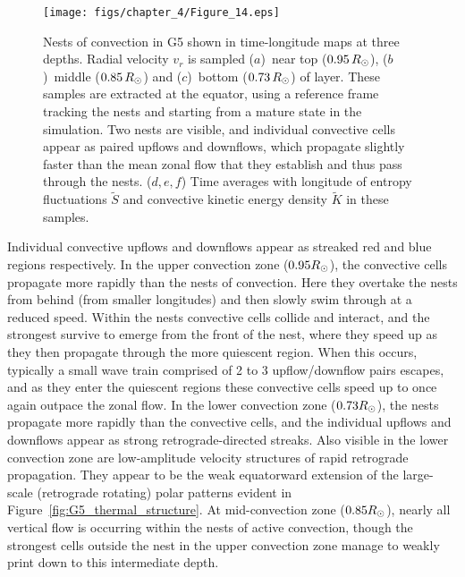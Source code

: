\begin{figure}
  \texttt{[image: figs/chapter\_4/Figure\_14.eps]}
  \caption[Nests of convection in G5 shown in time-longitude maps at three depths]
  {Nests of convection in G5 shown in time-longitude maps at three
  depths. Radial velocity $v_r$ is sampled ($a$)~near top
  ($0.95\thinspace R_\odot$), ($b$)~middle ($0.85\thinspace R_\odot$)
  and ($c$)~bottom ($0.73\thinspace R_\odot$) of layer.
  These samples are extracted at the equator, using a reference frame
  tracking the nests and starting from a mature state in the simulation.
  Two nests are visible, and individual convective cells appear
  as paired upflows and downflows, which propagate slightly faster than the mean zonal flow that they
  establish and thus pass through the nests.
  ($d,e,f$) Time averages with longitude of entropy fluctuations
  $\widetilde{S}$ and convective kinetic energy density $\widetilde{K}$ in these samples.
  \label{fig:time_longitude_map_turf5_all_3_depths}}
\end{figure}

Individual convective upflows and downflows appear as streaked red and blue regions
respectively.  In the upper convection zone ($0.95 R_\odot$), the
convective cells propagate more rapidly than the nests of convection.
Here they overtake the nests from behind (from smaller longitudes) and
then slowly swim through at a reduced speed.  Within the nests
convective cells collide and interact, and the strongest survive to
emerge from the front of the nest, where they speed up as they then
propagate through the more quiescent region.  
When this occurs, typically a small wave train comprised of 2 to 3
upflow/downflow pairs escapes, and as they enter the quiescent regions
these convective cells speed up to once again outpace the zonal flow.
In the lower convection
zone ($0.73 R_\odot$), the nests propagate more rapidly than the
convective cells, and the individual upflows and downflows appear as
strong retrograde-directed streaks.  Also visible in the lower
convection zone are low-amplitude velocity structures of rapid retrograde
propagation.  They appear to be the weak
equatorward extension of the large-scale (retrograde rotating) polar
patterns evident in Figure~\ref{fig:G5_thermal_structure}.  At
mid-convection zone ($0.85 R_\odot$), nearly all vertical flow is
occurring within the nests of active convection, though the strongest
cells outside the nest in the upper convection zone manage to weakly
print down to this intermediate depth.

